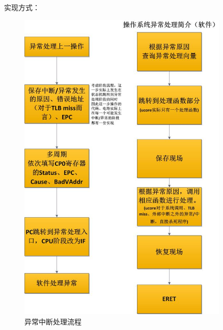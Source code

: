             实现方式：
            \begin{figure}[!hbp]
                    \centering
                    \caption{异常中断处理流程}
                    \includegraphics[width=0.9\textwidth]{picture/Exception.jpg}
            \end{figure}
                
